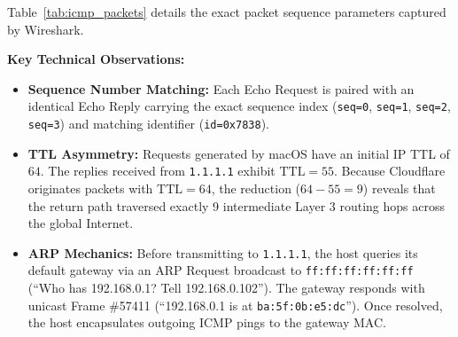 \documentclass[11pt,a4paper]{article}
\begin{document}
Table~\ref{tab:icmp_packets} details the exact packet sequence parameters captured by Wireshark.
\begin{table}[H]
\centering
\caption{Captured ICMP Echo Request and Reply Sequence Details}
\label{tab:icmp_packets}
\end{table}

\textbf{Key Technical Observations:}
\begin{itemize}[leftmargin=*]
    \item \textbf{Sequence Number Matching:} Each Echo Request is paired with an identical Echo Reply carrying the exact sequence index (\texttt{seq=0}, \texttt{seq=1}, \texttt{seq=2}, \texttt{seq=3}) and matching identifier (\texttt{id=0x7838}).
    \item \textbf{TTL Asymmetry:} Requests generated by macOS have an initial IP TTL of $64$. The replies received from \texttt{1.1.1.1} exhibit $\text{TTL} = 55$. Because Cloudflare originates packets with $\text{TTL} = 64$, the reduction ($64 - 55 = 9$) reveals that the return path traversed exactly 9 intermediate Layer 3 routing hops across the global Internet.
    \item \textbf{ARP Mechanics:} Before transmitting to \texttt{1.1.1.1}, the host queries its default gateway via an ARP Request broadcast to \texttt{ff:ff:ff:ff:ff:ff} (``Who has 192.168.0.1? Tell 192.168.0.102''). The gateway responds with unicast Frame \#57411 (``192.168.0.1 is at \texttt{ba:5f:0b:e5:dc}''). Once resolved, the host encapsulates outgoing ICMP pings to the gateway MAC.
\end{itemize}
\end{document}
